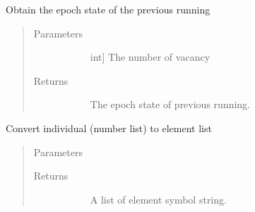 \documentclass[letterpaper,10pt,english]{sphinxmanual}
\begin{document}
\begin{fulllineitems}
\begin{fulllineitems}
\end{fulllineitems}


\begin{fulllineitems}
\label{\detokenize{pygace.examples.hfo2:pygace.examples.hfo2.hfo2_gace.HFO2App.get_epoch}}
Obtain the epoch state of the previous running
\begin{quote}\begin{description}
\item[{Parameters}] \leavevmode\begin{description}
\item[{}] \leavevmode{[}int{]}
The number of vacancy

\end{description}

\item[{Returns}] \leavevmode\begin{description}
\item[{}] \leavevmode
The epoch state of previous running.

\end{description}

\end{description}\end{quote}

\end{fulllineitems}


\begin{fulllineitems}
\label{\detokenize{pygace.examples.hfo2:pygace.examples.hfo2.hfo2_gace.HFO2App.ind_to_elis}}
Convert individual (number list) to element list
\begin{quote}\begin{description}
\item[{Parameters}] \leavevmode\begin{description}
\item[{}] \leavevmode
\end{description}

\item[{Returns}] \leavevmode\begin{description}
\item[{}] \leavevmode
A list of element symbol string.


\end{description}
\end{description}
\end{quote}
\end{fulllineitems}
\end{fulllineitems}
\end{document}
